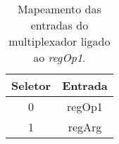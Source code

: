 \begin{table}[]
\centering
\begin{tabular}{|c|c|}
\hline
\textbf{Seletor} & \textbf{Entrada} \\ \hline
0       & regOp1  \\ \hline
1       & regArg  \\ \hline
\end{tabular}
\caption{Mapeamento das entradas do multiplexador ligado ao \textit{regOp1}.}
\label{table_muxRegOp1}
\end{table}